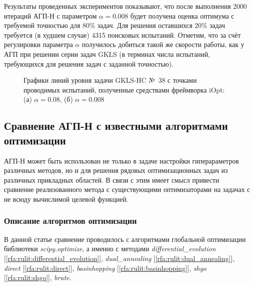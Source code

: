 \documentclass[a4paper,12pt,russian]{article}
\begin{document}
Результаты проведенных экспериментов показывают, что после выполнения 2000 итераций АГП-Н с параметром $\alpha = 0.008$ будет получена оценка оптимума с требуемой точностью для 80\% задач. Для решения оставшихся 20\% задач требуется (в худшем случае) 4315 поисковых испытаний. Отметим, что за счёт регулировки параметра $\alpha$ получилось добиться такой же скорости работы, как у  АГП при решении серии задач GKLS (в терминах числа испытаний, требующихся для решения задач с заданной точностью).

\begin{figure}[h!]
	\caption{Графики линий уровня задачи GKLS-HC №~38 с точками проводимых испытаний, полученные средствами фреймворка iOpt: (а) $\alpha = 0.08$, (б) $\alpha = 0.008$ }
	\label{iOpt_result}
\end{figure}

\subsection{Сравнение АГП-Н с известными алгоритмами оптимизации}

АГП-Н может быть использован не только в задаче настройки гиперараметров различных методов, но и для решения рядовых оптимизационных задач из различных прикладных областей. В связи с этим имеет смысл привести сравнение реализованного метода с существующими оптимизаторами на задачах с не всюду вычислимой целевой функцией.

\subsubsection{Описание алгоритмов оптимизации}

В данной статье сравнение проводилось с алгоритмами глобальной оптимизации библиотеки \textit{scipy.optimize}, а именно с методами \textit{differential\_evolution} [\ref{rfa:rulit:differential_evolution}], \textit{dual\_annealing} [\ref{rfa:rulit:dual_annealing}], \textit{direct} [\ref{rfa:rulit:direct}], \textit{basinhopping} [\ref{rfa:rulit:basinhopping}], \textit{shgo} [\ref{rfa:rulit:shgo}], \textit{brute}.
\end{document}
